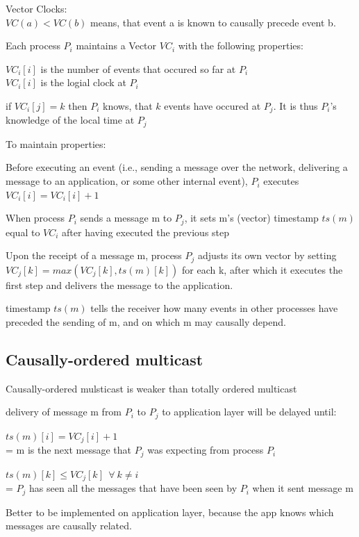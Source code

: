 \documentclass[ngerman,a4paper]{report}
\begin{document}
\begin{compactitem}
	\item Vector Clocks: \\
		$VC(a) < VC(b)$ means, that event a is known to causally precede event b.
	\item Each process $P_i$ maintains a Vector $VC_i$ with the following properties:
		\begin{compactenum}
			\item $VC_i[i]$ is the number of events that occured so far at $P_i$ \\
				$VC_i[i]$ is the logial clock at $P_i$
			\item if $VC_i[j]=k$ then $P_i$ knows, that $k$ events have occured at $P_j$. It is thus $P_i$'s knowledge of the local time at $P_j$
		\end{compactenum}
 	\item To maintain properties:
 			\begin{compactenum}
 			\item Before executing an event (i.e., sending a message over the network, delivering a message to an application, or some other internal event), $P_i$ executes $VC_i[i] = VC_i[i] + 1$
 			\item When process $P_i$ sends a message m to $P_j$, it sets m's (vector) timestamp $ts(m)$ equal to $VC_i$ after having executed the previous step
 			\item Upon the receipt of a message m, process $P_j$ adjusts its own vector by setting $VC_j[k] = max(VC_j[k], ts(m)[k])$ for each k, after which it executes the first step and delivers the message to the application.
		\end{compactenum}
		\item timestamp $ts (m)$ tells the receiver how many events in other processes have preceded the sending of m, and on which m may causally depend.
\end{compactitem}
\subsection{Causally-ordered multicast}
\begin{compactitem}
    \item Causally-ordered mulsticast is weaker than totally ordered multicast
    \item delivery of message m from $P_i$ to $P_j$ to application layer will be delayed until:
	\begin{compactenum}
		\item $ts(m)[i] = VC_j[i]+1$ \\
		= m is the next message that $P_j$ was expecting from process $P_i$
		\item $ts(m)[k] \leq VC_j[k] \ \ \forall \ k \neq i$ \\
		= $P_j$ has seen all the messages that have been seen by $P_i$ when it sent message m

	\end{compactenum}
	\item Better to be implemented on application layer, because the app knows which messages are causally related.
\end{compactitem}
\end{document}

